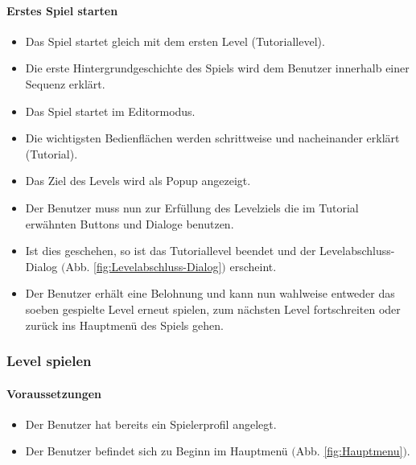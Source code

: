 \paragraph{Erstes Spiel starten}
\begin{itemize}
	\item Das Spiel startet gleich mit dem ersten Level (Tutoriallevel).
	\item Die erste Hintergrundgeschichte des Spiels wird dem Benutzer innerhalb einer Sequenz erklärt.
	\item Das Spiel startet im Editormodus.
	\item Die wichtigsten Bedienflächen werden schrittweise und nacheinander erklärt (Tutorial).
	\item Das Ziel des Levels wird als Popup angezeigt.
	\item Der Benutzer muss nun zur Erfüllung des Levelziels die im Tutorial erwähnten Buttons und Dialoge benutzen.
	\item Ist dies geschehen, so ist das Tutoriallevel beendet und der Levelabschluss-Dialog $($Abb. \ref{fig:Levelabschluss-Dialog}$)$ erscheint.
	\item Der Benutzer erhält eine Belohnung und kann nun wahlweise entweder das soeben gespielte Level erneut spielen, zum nächsten Level fortschreiten oder zurück ins Hauptmenü des Spiels gehen.
\end{itemize}

\subsubsection{Level spielen}
\paragraph{Voraussetzungen}
\begin{itemize}
	\item Der Benutzer hat bereits ein Spielerprofil angelegt.
	\item Der Benutzer befindet sich zu Beginn im Hauptmenü $($Abb. \ref{fig:Hauptmenu}$)$.
\end{itemize}
